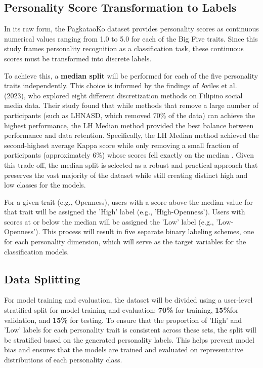 \subsection{Personality Score Transformation to Labels}
In its raw form, the PagkataoKo dataset provides personality scores as continuous numerical values ranging from 1.0 to 5.0 for each of the Big Five traits. Since this study frames personality recognition as a classification task, these continuous scores must be transformed into discrete labels.

To achieve this, a \textbf{median split} will be performed for each of the five personality traits independently. This choice is informed by the findings of Aviles et al. (2023), who explored eight different discretization methods on Filipino social media data. Their study found that while methods that remove a large number of participants (such as LHNASD, which removed 70\% of the data) can achieve the highest performance, the LH Median method provided the best balance between performance and data retention. Specifically, the LH Median method achieved the second-highest average Kappa score while only removing a small fraction of participants (approximately 6\%) whose scores fell exactly on the median \citep{aviles2023}. Given this trade-off, the median split is selected as a robust and practical approach that preserves the vast majority of the dataset while still creating distinct high and low classes for the models.

For a given trait (e.g., Openness), users with a score above the median value for that trait will be assigned the 'High' label (e.g., 'High-Openness'). Users with scores at or below the median will be assigned the 'Low' label (e.g., 'Low-Openness'). This process will result in five separate binary labeling schemes, one for each personality dimension, which will serve as the target variables for the classification models.

\subsection{Data Splitting}
For model training and evaluation, the dataset will be divided using a user-level stratified split for model training and evaluation: \textbf{70\%} for training, \textbf{15\%}for validation, and \textbf{15\%} for testing. To ensure that the proportion of 'High' and 'Low' labels for each personality trait is consistent across these sets, the split will be stratified based on the generated personality labels. This helps prevent model bias and ensures that the models are trained and evaluated on representative distributions of each personality class.

